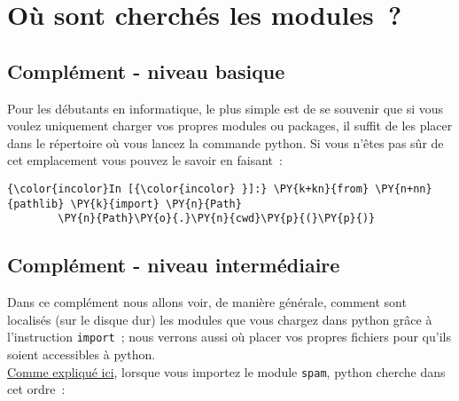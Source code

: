     \hypertarget{ouxf9-sont-cherchuxe9s-les-modules}{%
\section{Où sont cherchés les
modules~?}\label{ouxf9-sont-cherchuxe9s-les-modules}}

    \hypertarget{compluxe9ment---niveau-basique}{%
\subsection{Complément - niveau
basique}\label{compluxe9ment---niveau-basique}}

    Pour les débutants en informatique, le plus simple est de se souvenir
que si vous voulez uniquement charger vos propres modules ou packages,
il suffit de les placer dans le répertoire où vous lancez la commande
python. Si vous n'êtes pas sûr de cet emplacement vous pouvez le savoir
en faisant~:

    \begin{Verbatim}[commandchars=\\\{\}]
{\color{incolor}In [{\color{incolor} }]:} \PY{k+kn}{from} \PY{n+nn}{pathlib} \PY{k}{import} \PY{n}{Path}
        \PY{n}{Path}\PY{o}{.}\PY{n}{cwd}\PY{p}{(}\PY{p}{)}
\end{Verbatim}


    \hypertarget{compluxe9ment---niveau-intermuxe9diaire}{%
\subsection{Complément - niveau
intermédiaire}\label{compluxe9ment---niveau-intermuxe9diaire}}

    Dans ce complément nous allons voir, de manière générale, comment sont
localisés (sur le disque dur) les modules que vous chargez dans python
grâce à l'instruction \texttt{import}~; nous verrons aussi où placer vos
propres fichiers pour qu'ils soient accessibles à python.\\

    \href{https://docs.python.org/3/tutorial/modules.html\#the-module-search-path}{Comme
expliqué ici}, lorsque vous importez le module \texttt{spam}, python
cherche dans cet ordre~:

